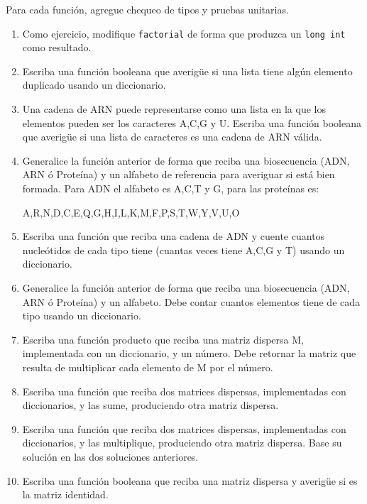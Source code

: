Para cada función, agregue chequeo de tipos y pruebas unitarias.
\begin{enumerate}
\item Como ejercicio, modifique \texttt{factorial} de forma que produzca
un \texttt{long int} como resultado.
\item Escriba una función booleana que averigüe si una lista tiene algún
elemento duplicado usando un diccionario.
\item Una cadena de ARN puede representarse como una lista en la que los
elementos pueden ser los caracteres A,C,G y U. Escriba una función
booleana que averigüe si una lista de caracteres es una cadena de
ARN válida.
\item Generalice la función anterior de forma que reciba una biosecuencia
(ADN, ARN ó Proteína) y un alfabeto de referencia para averiguar si
está bien formada. Para ADN el alfabeto es A,C,T y G, para las proteínas
es:

A,R,N,D,C,E,Q,G,H,I,L,K,M,F,P,S,T,W,Y,V,U,O
\item Escriba una función que reciba una cadena de ADN y cuente cuantos
nucleótidos de cada tipo tiene (cuantas veces tiene A,C,G y T) usando
un diccionario.
\item Generalice la función anterior de forma que reciba una biosecuencia
(ADN, ARN ó Proteína) y un alfabeto. Debe contar cuantos elementos
tiene de cada tipo usando un diccionario.
\item Escriba una función producto que reciba una matriz dispersa M, implementada
con un diccionario, y un número. Debe retornar la matriz que resulta
de multiplicar cada elemento de M por el número.
\item Escriba una función que reciba dos matrices dispersas, implementadas
con diccionarios, y las sume, produciendo otra matriz dispersa.
\item Escriba una función que reciba dos matrices dispersas, implementadas
con diccionarios, y las multiplique, produciendo otra matriz dispersa.
Base su solución en las dos soluciones anteriores.
\item Escriba una función booleana que reciba una matriz dispersa y averigüe
si es la matriz identidad. 
\end{enumerate}

